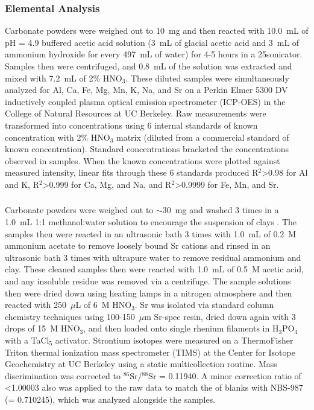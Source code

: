 \subsubsection{Elemental Analysis}

Carbonate powders were weighed out to 10~mg and then reacted with 10.0~mL of pH = 4.9 buffered acetic acid solution (3~mL of glacial acetic acid and 3~mL of ammonium hydroxide for every 497~mL of water) for 4-5 hours in a 25\degreesC sonicator. Samples then were centrifuged, and 0.8~mL of the solution was extracted and mixed with 7.2~mL of 2\% HNO$_{3}$. These diluted samples were simultaneously analyzed for Al, Ca, Fe, Mg, Mn, K, Na, and Sr on a Perkin Elmer 5300 DV inductively coupled plasma optical emission spectrometer (ICP-OES) in the College of Natural Resources at UC Berkeley. Raw measurements were transformed into concentrations using 6 internal standards of known concentration with 2\% HNO$_{3}$ matrix (diluted from a commercial standard of known concentration). Standard concentrations bracketed the concentrations observed in samples. When the known concentrations were plotted against measured intensity, linear fits through these 6 standards produced R$^{2}$\textgreater0.98 for Al and K, R$^{2}$\textgreater0.999 for Ca, Mg, and Na, and R$^{2}$\textgreater0.9999 for Fe, Mn, and Sr.

\subsubsection{\SrSr}

Carbonate powders were weighed out to $\sim$30~mg and washed 3 times in a 1.0~mL 1:1 methanol:water solution to encourage the suspension of clays \citep{McArthur2006a}. The samples then were reacted in an ultrasonic bath 3 times with 1.0~mL of 0.2~M ammonium acetate to remove loosely bound Sr cations and rinsed in an ultrasonic bath 3 times with ultrapure water to remove residual ammonium and clay. These cleaned samples then were reacted with 1.0~mL of 0.5~M acetic acid, and any insoluble residue was removed via a centrifuge. The sample solutions then were dried down using heating lamps in a nitrogen atmosphere and then reacted with 250~$\mu$L of 6~M HNO$_{3}$. Sr was isolated via standard column chemistry techniques using 100-150~$\mu$m Sr-spec resin, dried down again with 3 drops of 15~M HNO$_{3}$, and then loaded onto single rhenium filaments in H$_{3}$PO$_{4}$ with a TaCl$_{5}$ activator. Strontium isotopes were measured on a ThermoFisher Triton thermal ionization mass spectrometer (TIMS) at the Center for Isotope Geochemistry at UC Berkeley using a static multicollection routine. Mass discrimination was corrected to $^{86}$Sr/$^{88}$Sr = 0.11940. A minor correction ratio of \textless1.00003 also was applied to the raw data to match the \SrSr of blanks with NBS-987 (\SrSr = 0.710245), which was analyzed alongside the samples.

